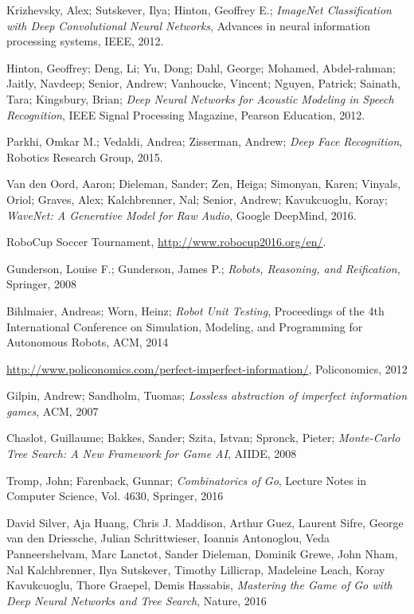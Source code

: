 \documentclass[12pt]{report}
\begin{document}

%
\newpage  
\begin{thebibliography}{99}
 Krizhevsky, Alex; Sutskever, Ilya; Hinton, Geoffrey E.; \emph{ImageNet Classification with Deep Convolutional Neural Networks}, Advances in neural information processing systems, IEEE, 2012.

 Hinton, Geoffrey; Deng, Li; Yu, Dong; Dahl, George; Mohamed, Abdel-rahman; Jaitly, Navdeep; Senior, Andrew; Vanhoucke, Vincent; Nguyen, Patrick; Sainath, Tara; Kingsbury, Brian; \emph{Deep Neural Networks for Acoustic Modeling in Speech Recognition},  IEEE Signal Processing Magazine, Pearson Education, 2012.

 Parkhi, Omkar M.; Vedaldi, Andrea; Zisserman, Andrew; \emph{Deep Face Recognition}, Robotics Research Group, 2015.

 Van den Oord, Aaron; Dieleman, Sander; Zen, Heiga; Simonyan, Karen; Vinyals, Oriol; Graves, Alex; Kalchbrenner, Nal; Senior, Andrew; Kavukcuoglu, Koray; \emph{WaveNet: A Generative Model for Raw Audio}, Google DeepMind, 2016.

 RoboCup Soccer Tournament, \url{http://www.robocup2016.org/en/}.

 Gunderson, Louise F.; Gunderson, James P.; \emph{Robots, Reasoning, and Reification}, Springer, 2008

 Bihlmaier, Andreas; Worn, Heinz; \emph{Robot Unit Testing}, Proceedings of the 4th International Conference on Simulation, Modeling, and Programming for Autonomous Robots, ACM, 2014

 \url{http://www.policonomics.com/perfect-imperfect-information/}, Policonomics, 2012

 Gilpin, Andrew; Sandholm, Tuomas; \emph{Lossless abstraction of imperfect information games}, ACM, 2007

 Chaslot, Guillaume; Bakkes, Sander; Szita, Istvan; Spronck, Pieter; \emph{Monte-Carlo Tree Search: A New Framework for Game AI}, AIIDE, 2008

 Tromp, John; Farenback, Gunnar; \emph{Combinatorics of Go}, Lecture Notes in Computer Science, Vol. 4630, Springer, 2016

 David Silver, Aja Huang, Chris J. Maddison, Arthur Guez, Laurent Sifre, George van den Driessche, Julian Schrittwieser, Ioannis Antonoglou, Veda Panneershelvam, Marc Lanctot, Sander Dieleman, Dominik Grewe, John Nham, Nal Kalchbrenner, Ilya Sutskever, Timothy Lillicrap, Madeleine Leach, Koray Kavukcuoglu, Thore Graepel, Demis Hassabis, \emph{Mastering the Game of Go with Deep Neural Networks and Tree Search}, Nature, 2016


\end{thebibliography}
\end{document}
